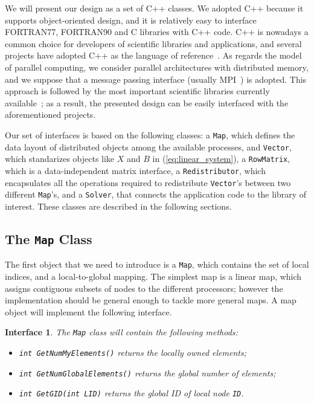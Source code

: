 \documentclass[acmtocl]{acmtrans2m}
\newtheorem{interface}{Interface}[section]
\begin{document}
We will present our design as a set of C++ classes. We adopted C++ because it
supports object-oriented design, and it is relatively easy to interface
FORTRAN77, FORTRAN90 and C libraries with C++ code. C++ is nowadays a common
choice for developers  of scientific libraries and applications, and several
projects have adopted C++ as the language of
reference~\cite{heroux05trilinos}. As regards the model of parallel computing,
we consider parallel architectures with distributed memory, and we suppose
that a message passing interface (usually MPI~\cite{mpi-forum}) is adopted.
This approach is followed by the most important scientific libraries currently
available~\cite{heroux05trilinos,petsc-user-ref,falgout02hypre}; as a result, the presented
design can be easily interfaced with the aforementioned projects.

\bigskip

Our set of interfaces is based on the following classes: a {\tt Map}, which
defines the data layout of distributed objects among the available processes,
and {\tt Vector}, which standarizes objects like $X$ and $B$ in
(\ref{eq:linear_system}), a {\tt RowMatrix}, which is a data-independent
matrix interface, a {\tt Redistributor}, which encapsulates all the operations
required to redistribute {\tt Vector}'s between two different {\tt Map}'s, and
a {\tt Solver}, that connects the application code to the library of interest.
These classes are described in the following sections.

\subsection{The {\tt Map} Class}

The first object that we need to introduce is a {\tt Map}, which contains the
set of local indices, and a local-to-global mapping. The simplest map is a
linear map, which assigns contiguous subsets of nodes to the different
processors; however the implementation should be general enough to tackle more
general maps. A map object will implement the following interface.

\begin{interface}
\label{int:map}
The {\tt Map} class will contain the following methods:

\begin{itemize}
\item {\tt int GetNumMyElements()} returns the locally owned elements;
\item {\tt int GetNumGlobalElements()} returns the global number of elements;
\item {\tt int GetGID(int LID)} returns the global ID of local node {\tt ID}.
\end{itemize}
\end{interface}
\end{document}
